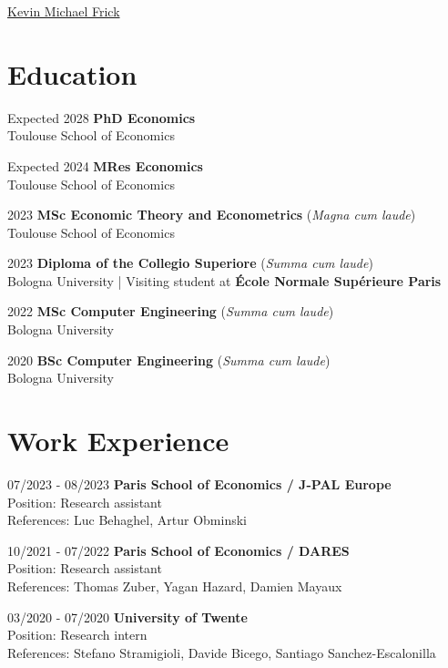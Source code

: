 \documentclass[11pt,a4paper]{article}
\newcommand{\longunderline}[1]{\uline{#1\hfill\mbox{}}}
\begin{document}
\date{}
\thispagestyle{empty}
\setlength\cvlabelwidth{90pt}

\begin{cv}
{\huge \longunderline{Kevin Michael Frick}}
\section*{Education}
\begin{cvlist}{}
  \itemsep -5pt

	\item[Expected 2028]
		\textbf{PhD Economics}\\
    Toulouse School of Economics
      \item[Expected 2024]
    \textbf{MRes Economics} \\
    Toulouse School of Economics
  \item[2023]
    \textbf{MSc Economic Theory and Econometrics} (\emph{Magna cum laude})\\
    Toulouse School of Economics
  \item[2023]
    \textbf{Diploma of the Collegio Superiore} (\emph{Summa cum laude})\\
    Bologna University  |  Visiting student at \textbf{École Normale Supérieure Paris}
  \item[2022]
    \textbf{MSc Computer Engineering} (\emph{Summa cum laude})\\
    Bologna University
  \item[2020]
    \textbf{BSc Computer Engineering} (\emph{Summa cum laude})\\
    Bologna University
\end{cvlist}
\vspace{-24pt}
\section*{Work Experience}
\begin{cvlist}{}
  \itemsep -5pt
	\item[07/2023 - 08/2023]
		\textbf{Paris School of Economics / J-PAL Europe}\\
		Position: Research assistant\\
		References: Luc Behaghel, Artur Obminski
	\item[10/2021 - 07/2022]
    \textbf{Paris School of Economics / DARES}\\
		Position: Research assistant\\
		References: Thomas Zuber, Yagan Hazard, Damien Mayaux
	\item[03/2020 - 07/2020]
		\textbf{University of Twente}\\
		Position: Research intern\\
		References: Stefano Stramigioli, Davide Bicego, Santiago Sanchez-Escalonilla
\end{cvlist}
\vspace{-24pt}

\end{cv}
\end{document}
